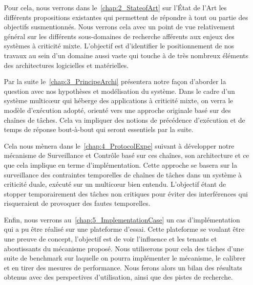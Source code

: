 \documentclass[french, a4paper, 11pt, twoside, pdftex]{StyleThese}
\begin{document}
	Pour cela, nous verrons dans le~\autoref{chap:2_StateofArt} sur l'État de l'Art les différents propositions existantes qui permettent de répondre à tout ou partie des objectifs susmentionnés. Nous verrons cela avec un point de vue relativement général sur les différents sous-domaines de recherche afférents aux enjeux des systèmes à criticité mixte. L'objectif est d'identifier le positionnement de nos travaux au sein d'un domaine aussi vaste qui touche à de très nombreux éléments des architectures logicielles et matérielles.  %
	
	Par la suite le~\autoref{chap:3_PrincipeArchi} présentera notre façon d'aborder la question avec nos hypothèses et modélisation du système. Dans le cadre d'un système multicœur qui héberge des applications à criticité mixte, on verra le modèle d'exécution adopté, orienté vers une approche originale basé sur des chaînes de tâches. Cela va impliquer des notions de précédence d'exécution et de temps de réponse bout-à-bout qui seront essentiels par la suite.
	
	Cela nous mènera dans le~\autoref{chap:4_ProtocolExpe} suivant à développer notre mécanisme de Surveillance et Contrôle basé sur ces chaînes, son architecture et ce que cela implique en terme d'implémentation. Cette approche se basera sur la surveillance des contraintes temporelles de chaînes de tâches dans un système à criticité duale, exécuté sur un multicœur bien entendu. L'objectif étant de stopper temporairement des tâches non critiques pour éviter des interférences qui risqueraient de provoquer des fautes temporelles.
	
	Enfin, nous verrons au~\autoref{chap:5_ImplementationCase} un cas d'implémentation qui a pu être réalisé sur une plateforme d'essai. Cette plateforme se voulant être une preuve de concept, l'objectif est de voir l'influence et les tenants et aboutissants du mécanisme proposé. Nous utiliserons pour cela des tâches d'une suite de benchmark sur laquelle on pourra implémenter le mécanisme, le calibrer et en tirer des mesures de performance.
	Nous ferons alors un bilan des résultats obtenus avec des perspectives d'utilisation, ainsi que des pistes de recherche. 
    


\ifdefined{}
\else


\end{document}
